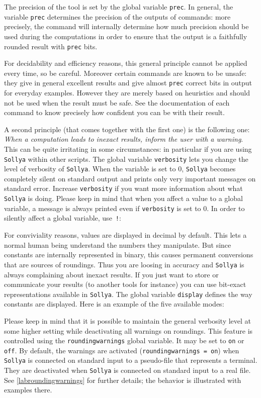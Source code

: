 \documentclass[a4paper]{article}
\newcommand{\com}[1]{\texttt{#1}}
\newcommand{\key}[1]{\texttt{#1}}
\newcommand{\sollya}{\texttt{Sollya}\xspace}
\begin{document}
The precision of the tool is set by the global variable \key{prec}. In general, the variable \key{prec} determines the precision of the outputs of commands: more precisely, the command will internally determine how much precision should be used during the computations in order to ensure that the output is a faithfully rounded result with \key{prec} bits.

For decidability and efficiency reasons, this general principle cannot be applied every time, so be careful. Moreover certain commands are known to be unsafe: they give in general excellent results and give almost \key{prec} correct bits in output for everyday examples. However they are merely based on heuristics and should not be used when the result must be safe. See the documentation of each command to know precisely how confident you can be with their result.

A second principle (that comes together with the first one) is the following one: \emph{When a computation leads to inexact results, inform the user with a warning}. This can be quite irritating in some circumstances: in particular if you are using \sollya within other scripts. The global variable \key{verbosity} lets you change the level of verbosity of \sollya. When the variable is set to $0$, \sollya becomes completely silent on standard output and prints only very important messages on standard error. Increase \key{verbosity} if you want more information about what \sollya is doing. Please keep in mind that when you affect a value to a global variable, a message is always printed even if \com{verbosity} is set to $0$. In order to silently affect a global variable, use~\texttt{!}:



For conviviality reasons, values are displayed in decimal by default. This lets a normal human being understand the numbers they manipulate. But since constants are internally represented in binary, this causes permanent conversions that are sources of roundings. Thus you are loosing in accuracy and \sollya is always complaining about inexact results. If you just want to store or communicate your results (to another tools for instance) you can use bit-exact representations available in \sollya. The global variable \key{display} defines the way constants are displayed. Here is an example of the five available modes:



Please keep in mind that it is possible to maintain the general verbosity level at
some higher setting while deactivating all warnings on roundings. This
feature is controlled using the \key{roundingwarnings} global
variable. It may be set to \key{on} or \key{off}. By default, the
warnings are activated (\key{roundingwarnings = on}) when \sollya is
connected on standard input to a pseudo-file that represents a
terminal. They are deactivated when \sollya is connected on standard
input to a real file. See \ref{labroundingwarnings} for further details; the behavior is
illustrated with examples there.
\end{document}
